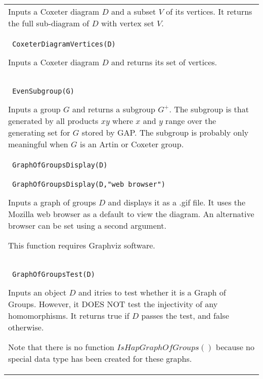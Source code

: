 \documentclass[a4paper,11pt]{report}
\begin{document}
{\begin{center}
\begin{tabular}{|l|}
 Inputs a Coxeter diagram $D$ and a subset $V$ of its vertices. It returns the full sub-diagram of $D$ with vertex set $V$. \\
 \index{CoxeterDiagramVertices} \texttt{ CoxeterDiagramVertices(D) } 

 Inputs a Coxeter diagram $D$ and returns its set of vertices. \\
 \index{EvenSubgroup} \texttt{ EvenSubgroup(G) } 

 Inputs a group $G$ and returns a subgroup $G^+$. The subgroup is that generated by all products $xy$ where $x$ and $y$ range over the generating set for $G$ stored by GAP. The subgroup is probably only meaningful when $G$ is an Artin or Coxeter group. \\
 \index{GraphOfGroupsDisplay} \texttt{ GraphOfGroupsDisplay(D) } \\
 \texttt{ GraphOfGroupsDisplay(D,"web browser") } 

 Inputs a graph of groups $D$ and displays it as a .gif file. It uses the Mozilla web browser as a default
to view the diagram. An alternative browser can be set using a second
argument. 

 This function requires Graphviz software. \\
 \index{GraphOfGroupsTest} \texttt{ GraphOfGroupsTest(D) } 

 Inputs an object $D$ and itries to test whether it is a Graph of Groups. However, it DOES NOT test
the injectivity of any homomorphisms. It returns true if $D$ passes the test, and false otherwise. 

 Note that there is no function $IsHapGraphOfGroups()$ because no special data type has been created for these graphs. \\
\end{tabular}\\[2mm]
\end{center}

 }

 
\end{document}
